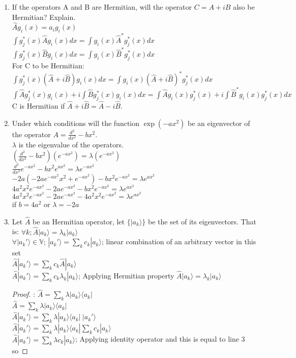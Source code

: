 \documentclass{article}
\begin{document}
\begin{enumerate}
\item If the operators A and B are Hermitian, will the operator $C=A+iB$ also be Hermitian? Explain.
\\ $\hat{A}g_i(x)=a_ig_i(x)$
\\ $\int g_j^*(x)\hat{A}g_i(x)dx=\int g_i(x)\hat{A}^*g_j^*(x)dx$
\\ $\int g_j^*(x)\hat{B}g_i(x)dx=\int g_i(x)\hat{B}^*g_j^*(x)dx$
\\ For C to be Hermitian:
\\ $\int g_j^*(x)(\hat{A}+i\hat{B})g_i(x)dx=\int g_i(x)(\hat{A}+i\hat{B})^*g_j^*(x)dx$
\\ $\int \hat{A}g_j^*(x)g_i(x)+i\int\hat{B}g_j^*(x)g_i(x)dx=\int \hat{A} g_i(x)g_j^*(x)+i\int\hat{B}^*g_i(x)g_j^*(x)dx$
\\ C is Hermitian if $\hat{A}+i\hat{B}=\hat{A}-i\hat{B}$.

\item Under which conditions will the function $\exp(-ax^2)$ be an eigenvector of the operator $A=\frac{d^2}{dx^2}-bx^2$.
\\ $\lambda$ is the eigenvalue of the operators.
\\ $\left(\frac{d^2}{dx^2}-bx^2\right)(e^{-ax^2})=\lambda(e^{-ax^2})$
\\ $\frac{d^2}{dx^2}e^{-ax^2}-bx^2e^{ax^2}=\lambda e^{-ax^2}$
\\ $-2a(-2ae^{-ax^2}x^2+e^{-ax^2})-bx^2e^{-ax^2}=\lambda e^{ax^2}$
\\ $4a^2x^2e^{-ax^2}-2ae^{-ax^2}-bx^2e^{-ax^2}=\lambda e^{ax^2}$
\\ $4a^2x^2e^{-ax^2}-2ae^{-ax^2}-4a^2x^2e^{-ax^2}=\lambda e^{ax^2}$ 
\\ if $b=4a^2$ or $\lambda =-2a$

\item Let $\hat{A}$ be an Hermitian operator, let $\{|a_k\rangle\}$ be the set of its eigenvectors. That is: $\forall k;\hat{A}|a_k\rangle=\lambda_k|a_k\rangle$
\\ $\forall |a_k'\rangle \in \mathbb{V}$; $ |a_k'\rangle=\sum_k c_k|a_k\rangle$; linear combination of an arbitrary vector in this set 
\\ $\hat{A}|a_k'\rangle=\sum_k c_k\hat{A}|a_k\rangle$
\\ $\hat{A}|a_k'\rangle=\sum_k c_k\lambda_k|a_k\rangle$; Applying Hermitian property $\hat{A}|a_k\rangle=\lambda_k|a_k\rangle$
 \begin{proof}: $\hat{A}=\sum_k\lambda|a_k\rangle\langle a_k|$
\\ $\hat{A}=\sum_k\lambda|a_k\rangle\langle a_k|$
\\ $\hat{A}|a_k'\rangle=\sum_k\lambda|a_k\rangle\langle a_k|~|a_k'\rangle$
\\ $\hat{A}|a_k'\rangle=\sum_k\lambda|a_k\rangle\langle a_k|\sum_k c_k|a_k\rangle$
\\ $\hat{A}|a_k'\rangle=\sum_k\lambda c_k|a_k\rangle$; Applying identity operator and this is equal to line 3 so \end{proof} 


\end{enumerate}
\end{document}
